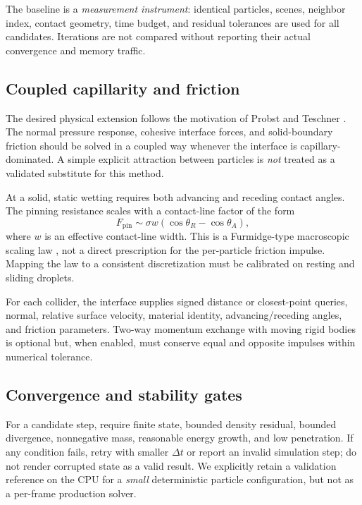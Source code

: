 \documentclass[10pt,a4paper]{article}
\begin{document}
The baseline is a \emph{measurement instrument}: identical particles, scenes, neighbor index, contact geometry, time budget, and residual tolerances are used for all candidates. Iterations are not compared without reporting their actual convergence and memory traffic.

\subsection{Coupled capillarity and friction}
The desired physical extension follows the motivation of Probst and Teschner \citep{probst2024}. The normal pressure response, cohesive interface forces, and solid-boundary friction should be solved in a coupled way whenever the interface is capillary-dominated. A simple explicit attraction between particles is \emph{not} treated as a validated substitute for this method.

At a solid, static wetting requires both advancing and receding contact angles. The pinning resistance scales with a contact-line factor of the form
\begin{equation}
F_{\mathrm{pin}}\sim \sigma w\left(\cos\theta_R-\cos\theta_A\right),
\label{eq:pinning}
\end{equation}
where $w$ is an effective contact-line width. This is a Furmidge-type macroscopic scaling law \citep{furmidge1962}, not a direct prescription for the per-particle friction impulse. Mapping the law to a consistent discretization must be calibrated on resting and sliding droplets.

For each collider, the interface supplies signed distance or closest-point queries, normal, relative surface velocity, material identity, advancing/receding angles, and friction parameters. Two-way momentum exchange with moving rigid bodies is optional but, when enabled, must conserve equal and opposite impulses within numerical tolerance.

\subsection{Convergence and stability gates}
For a candidate step, require finite state, bounded density residual, bounded divergence, nonnegative mass, reasonable energy growth, and low penetration. If any condition fails, retry with smaller $\Delta t$ or report an invalid simulation step; do not render corrupted state as a valid result. We explicitly retain a validation reference on the CPU for a \emph{small} deterministic particle configuration, but not as a per-frame production solver.
\end{document}
